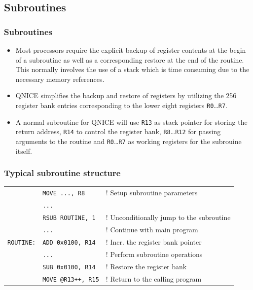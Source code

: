 \documentclass{beamer}
\begin{document}
  \subsection{Subroutines}
   \begin{frame}
    \frametitle{Subroutines}
    \begin{itemize}
     \item Most processors require the explicit backup of register contents
      at the begin of a subroutine as well as a corresponding restore at the 
      end of the routine. This normally involves the use of a stack which is 
      time consuming due to the necessary memory references.
     \item QNICE simplifies the backup and restore of registers by utilizing
      the 256 register bank entries corresponding to the lower eight registers
      {\tt R0}\dots{\tt R7}.
     \item A normal subroutine for QNICE will use {\tt R13} as stack pointer
      for storing the return address, {\tt R14} to control the register bank,
      {\tt R8}\dots{\tt R12} for passing arguments to the routine and
      {\tt R0}\dots{\tt R7} as working registers for the subrouine itself.
    \end{itemize}
   \end{frame}
%
   \begin{frame}
    \frametitle{Typical subroutine structure}
    {\small
    \begin{center}
     \begin{tabular}{lll}
      &{\tt MOVE ..., R8}&! Setup subroutine parameters\\
      &{\tt ...}&\\
      &{\tt RSUB ROUTINE, 1}&! Unconditionally jump to the subroutine\\
      &{\tt...}&! Continue with main program\\
      {\tt ROUTINE:}&{\tt ADD 0x0100, R14}&! Incr. the register bank pointer\\
      &{\tt ...}&! Perform subroutine operations\\
      &{\tt SUB 0x0100, R14}&! Restore the register bank\\
      &{\tt MOVE @R13++, R15}&! Return to the calling program\\
     \end{tabular}
    \end{center}
    }
   \end{frame}
%
\end{document}

